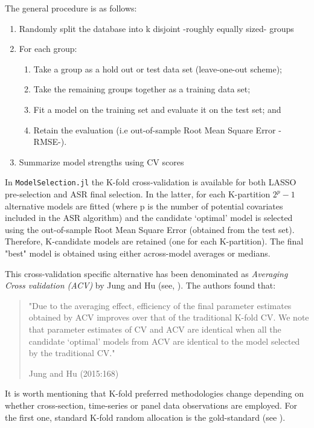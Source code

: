 \documentclass{article}
\begin{document}
The general procedure is as follows:

\begin{enumerate}
  \item Randomly split the database into k disjoint -roughly equally sized- groups
  \item For each group:
  \begin{enumerate}
    \item Take a group as a hold out or test data set (leave-one-out scheme);
    \item Take the remaining groups together as a training data set;
    \item Fit a model on the training set and evaluate it on the test set; and
    \item Retain the evaluation (i.e out-of-sample Root Mean Square Error -RMSE-).
  \end{enumerate}
  \item Summarize model strengths using CV scores
\end{enumerate}

In \verb|ModelSelection.jl| the K-fold cross-validation is available for both LASSO pre-selection and ASR final selection. In the latter, for each K-partition $2^{p} - 1$ alternative models are fitted (where p is the number of potential covariates included in the ASR algorithm) and the candidate ‘optimal’ model is selected using the out-of-sample Root Mean Square Error (obtained from the test set). Therefore, K-candidate models are retained (one for each K-partition). The final "best" model is obtained using either across-model averages or medians.

This cross-validation specific alternative has been denominated as \textit{Averaging Cross validation (ACV)} by Jung and Hu (see, \cite{jung2015}). The authors found that:

\begin{quote}
"Due to the averaging effect, efficiency of the final parameter estimates obtained by ACV improves over that of the traditional K-fold CV. We note that parameter estimates of CV and ACV are identical when all the candidate ‘optimal’ models from ACV are identical to the model selected by the traditional CV."

\hfill Jung and Hu (2015:168)
\end{quote}

It is worth mentioning that K-fold preferred methodologies change depending on whether cross-section, time-series or panel data observations are employed. For the first one, standard K-fold random allocation is the gold-standard (see \cite{arlot2010}). 
\end{document}
